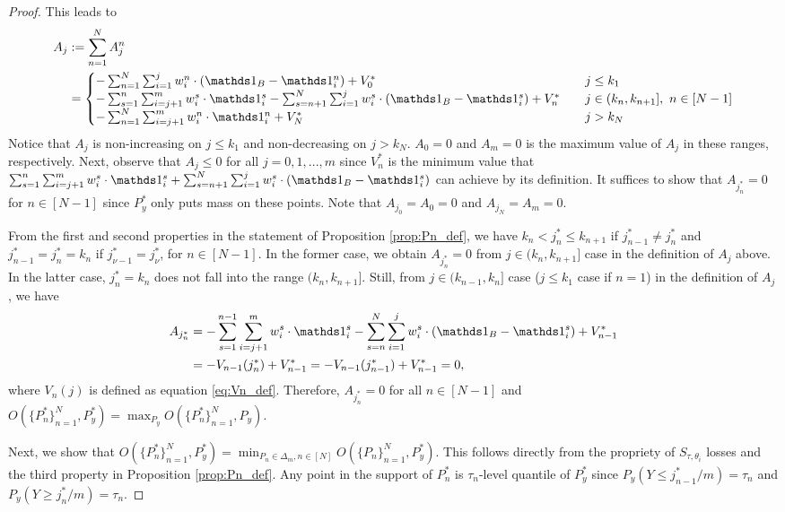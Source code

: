 \begin{proof}
  This leads to 
  \begin{align*}
  A_j & := \sum_{n=1}^N A_j^n \\
  &= \begin{cases}
  -\sum_{n=1}^N \sum_{i=1}^{j} w_i^n \cdot (\one_B - \one_i^n) + V_0^* & \quad j \leq k_1 \\
  -\sum_{s=1}^n \sum_{i=j+1}^{m} w_i^s \cdot \one_i^s - \sum_{s=n+1}^{N} \sum_{i=1}^{j} w_i^s \cdot (\one_B-\one_i^s) + V_n^* & \quad  j \in (k_n, k_{n+1}], \,\, n \in [N-1] \\
  -\sum_{n=1}^N \sum_{i=j+1}^{m} w_i^n \cdot \one_i^n + V_N^* & \quad j > k_N
  \end{cases}
  \end{align*}
  Notice that $A_j$ is non-increasing on $j \leq k_1$ and non-decreasing on $j > k_N$. $A_0 = 0$ and $A_m = 0$ is the maximum value of $A_j$ in these ranges, respectively. Next, observe that $A_j \leq 0$ for all $j=0,1,...,m$ since $V_n^*$ is the minimum value that $\sum_{s=1}^n \sum_{i=j+1}^{m} w_i^s \cdot \one_i^s + \sum_{s=n+1}^{N} \sum_{i=1}^{j} w_i^s \cdot (\one_B-\one_i^s)$ can achieve by its definition. It suffices to show that $A_{j_n^*} = 0$ for $n \in [N-1]$ since $P_y^*$ only puts mass on these points. Note that $A_{j_0} = A_0 = 0$ and $A_{j_N} = A_m = 0$.
  
  From the first and second properties in the statement of Proposition \ref{prop:Pn_def}, we have $k_n < j_n^* \leq k_{n+1}$ if $j_{n-1}^* \neq j_n^*$ and $j_{n-1}^* = j_n^*= k_n$ if $j_{\nu-1}^* = j_\nu^*$, for $n \in [N-1]$. In the former case, we obtain $A_{j_n^*} = 0$ from $j \in (k_n, k_{n+1}]$ case in the definition of $A_j$ above. In the latter case, $j_n^* = k_n$ does not fall into the range $(k_n, k_{n+1}]$. Still, from $j \in (k_{n-1}, k_{n}]$ case ($j \leq k_1$ case if $n=1$) in the definition of $A_j$ , we have
  \begin{align*}
  A_{j_n^*} 
  & = -\sum_{s=1}^{n-1} \sum_{i=j+1}^{m} w_i^s \cdot \one_i^s - \sum_{s=n}^{N} \sum_{i=1}^{j} w_i^s \cdot (\one_B - \one_i^s) + V_{n-1}^* \\
  & =  - V_{n-1}(j_n^*) + V_{n-1}^* = -V_{n-1}(j_{n-1}^*) + V_{n-1}^* = 0,
  \end{align*}
  where $V_n(j)$ is defined as equation \eqref{eq:Vn_def}. Therefore, $A_{j_n^*} = 0$ for all $n \in [N-1]$ and $O(\{P_n^*\}_{n=1}^N, P_y^*) = \max_{P_y} O(\{P_n^*\}_{n=1}^N, P_y)$. \smallskip
  
  Next, we show that $O(\{P_n^*\}_{n=1}^N, P_y^*) = \min_{P_n \in \Delta_m, n\in[N]} O(\{P_n\}_{n=1}^N, P_y^*)$. This follows directly from the propriety of $S_{\tau,\theta_i}$ losses and the third property in Proposition \ref{prop:Pn_def}. Any point in the support of $P_n^*$ is $\tau_n$-level quantile of $P_y^*$ since $P_y(Y \leq j_{n-1}^*/m) = \tau_n$ and $P_y(Y \geq j_n^*/m) = \tau_n$.
  

\end{proof}
